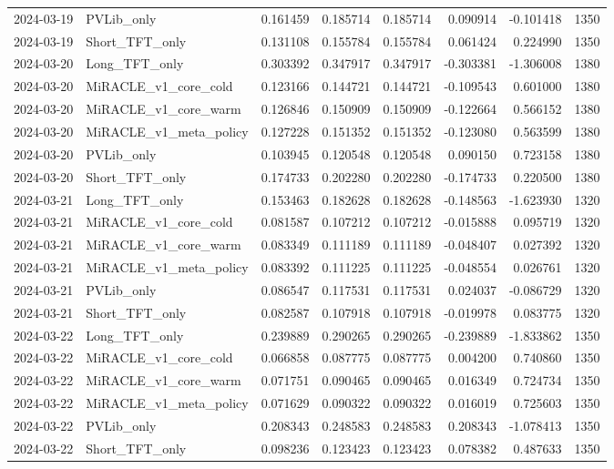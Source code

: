 \begin{tabular}{llrrrrrr}
2024-03-19 & PVLib_only & 0.161459 & 0.185714 & 0.185714 & 0.090914 & -0.101418 & 1350 \\
2024-03-19 & Short_TFT_only & 0.131108 & 0.155784 & 0.155784 & 0.061424 & 0.224990 & 1350 \\
2024-03-20 & Long_TFT_only & 0.303392 & 0.347917 & 0.347917 & -0.303381 & -1.306008 & 1380 \\
2024-03-20 & MiRACLE_v1_core_cold & 0.123166 & 0.144721 & 0.144721 & -0.109543 & 0.601000 & 1380 \\
2024-03-20 & MiRACLE_v1_core_warm & 0.126846 & 0.150909 & 0.150909 & -0.122664 & 0.566152 & 1380 \\
2024-03-20 & MiRACLE_v1_meta_policy & 0.127228 & 0.151352 & 0.151352 & -0.123080 & 0.563599 & 1380 \\
2024-03-20 & PVLib_only & 0.103945 & 0.120548 & 0.120548 & 0.090150 & 0.723158 & 1380 \\
2024-03-20 & Short_TFT_only & 0.174733 & 0.202280 & 0.202280 & -0.174733 & 0.220500 & 1380 \\
2024-03-21 & Long_TFT_only & 0.153463 & 0.182628 & 0.182628 & -0.148563 & -1.623930 & 1320 \\
2024-03-21 & MiRACLE_v1_core_cold & 0.081587 & 0.107212 & 0.107212 & -0.015888 & 0.095719 & 1320 \\
2024-03-21 & MiRACLE_v1_core_warm & 0.083349 & 0.111189 & 0.111189 & -0.048407 & 0.027392 & 1320 \\
2024-03-21 & MiRACLE_v1_meta_policy & 0.083392 & 0.111225 & 0.111225 & -0.048554 & 0.026761 & 1320 \\
2024-03-21 & PVLib_only & 0.086547 & 0.117531 & 0.117531 & 0.024037 & -0.086729 & 1320 \\
2024-03-21 & Short_TFT_only & 0.082587 & 0.107918 & 0.107918 & -0.019978 & 0.083775 & 1320 \\
2024-03-22 & Long_TFT_only & 0.239889 & 0.290265 & 0.290265 & -0.239889 & -1.833862 & 1350 \\
2024-03-22 & MiRACLE_v1_core_cold & 0.066858 & 0.087775 & 0.087775 & 0.004200 & 0.740860 & 1350 \\
2024-03-22 & MiRACLE_v1_core_warm & 0.071751 & 0.090465 & 0.090465 & 0.016349 & 0.724734 & 1350 \\
2024-03-22 & MiRACLE_v1_meta_policy & 0.071629 & 0.090322 & 0.090322 & 0.016019 & 0.725603 & 1350 \\
2024-03-22 & PVLib_only & 0.208343 & 0.248583 & 0.248583 & 0.208343 & -1.078413 & 1350 \\
2024-03-22 & Short_TFT_only & 0.098236 & 0.123423 & 0.123423 & 0.078382 & 0.487633 & 1350 \\

\end{tabular}
